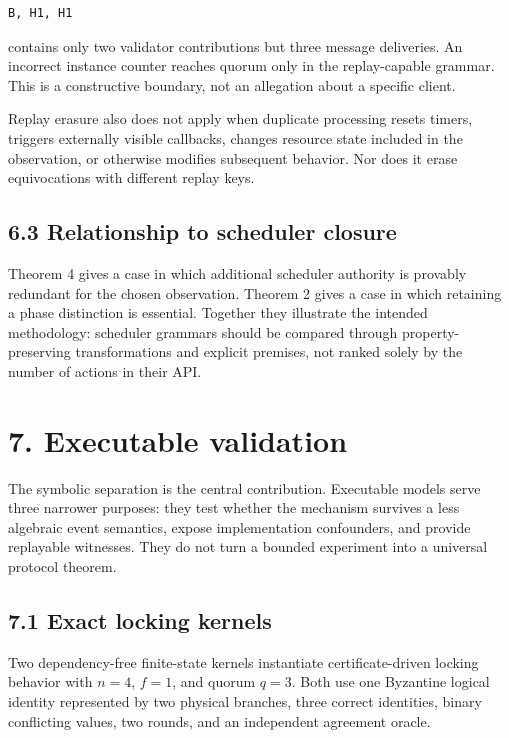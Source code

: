 \documentclass[10pt,a4paper]{article}
\begin{document}
\begin{verbatim}
B, H1, H1
\end{verbatim}

contains only two validator contributions but three message deliveries.
An incorrect instance counter reaches quorum only in the replay-capable
grammar. This is a constructive boundary, not an allegation about a
specific client.

Replay erasure also does not apply when duplicate processing resets
timers, triggers externally visible callbacks, changes resource state
included in the observation, or otherwise modifies subsequent behavior.
Nor does it erase equivocations with different replay keys.

\subsection{6.3 Relationship to scheduler
closure}\label{relationship-to-scheduler-closure}

Theorem 4 gives a case in which additional scheduler authority is
provably redundant for the chosen observation. Theorem 2 gives a case in
which retaining a phase distinction is essential. Together they
illustrate the intended methodology: scheduler grammars should be
compared through property-preserving transformations and explicit
premises, not ranked solely by the number of actions in their API.

\section{7. Executable validation}\label{executable-validation}

The symbolic separation is the central contribution. Executable models
serve three narrower purposes: they test whether the mechanism survives
a less algebraic event semantics, expose implementation confounders, and
provide replayable witnesses. They do not turn a bounded experiment into
a universal protocol theorem.

\subsection{7.1 Exact locking kernels}\label{exact-locking-kernels}

Two dependency-free finite-state kernels instantiate certificate-driven
locking behavior with \(n=4\), \(f=1\), and quorum \(q=3\). Both use one
Byzantine logical identity represented by two physical branches, three
correct identities, binary conflicting values, two rounds, and an
independent agreement oracle.
\end{document}
